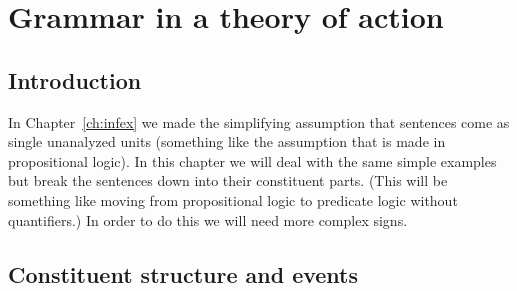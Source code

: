 \chapter{Grammar in a theory of action}
\label{ch:gram}
\setcounter{equation}{0}


\section{Introduction}

In Chapter~\ref{ch:infex} we made the simplifying assumption that
sentences come as single unanalyzed units (something like the
assumption that is made in propositional logic).  In this chapter we
will deal with the same simple examples but break the sentences down
into their constituent parts.  (This will be something like moving
from propositional logic to predicate logic without quantifiers.)
In order to do this we will need more complex signs.

\section{Constituent structure and events}

